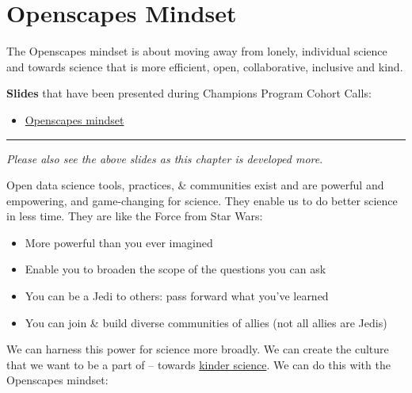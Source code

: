 \documentclass[
  letterpaper,
  DIV=11,
  numbers=noendperiod]{scrreprt}
\providecommand{\tightlist}{%
  \setlength{\itemsep}{0pt}\setlength{\parskip}{0pt}}
\begin{document}
\hypertarget{mindset}{%
\chapter{Openscapes Mindset}\label{mindset}}

The Openscapes mindset is about moving away from lonely, individual
science and towards science that is more efficient, open, collaborative,
inclusive and kind.

\textbf{Slides} that have been presented during Champions Program Cohort
Calls:

\begin{itemize}
\tightlist
\item
  \href{https://docs.google.com/presentation/d/1giEW0EIYVnxneGpOBSJnEqg-1CVBUGrbH8Z5gawdeBc/edit?usp=sharing}{Openscapes
  mindset}
\end{itemize}

\begin{center}\rule{0.5\linewidth}{0.5pt}\end{center}

\emph{Please also see the above slides as this chapter is developed
more}.

Open data science tools, practices, \& communities exist and are
powerful and empowering, and game-changing for science. They enable us
to do better science in less time. They are like the Force from Star
Wars:

\begin{itemize}
\tightlist
\item
  More powerful than you ever imagined
\item
  Enable you to broaden the scope of the questions you can ask
\item
  You can be a Jedi to others: pass forward what you've learned
\item
  You can join \& build diverse communities of allies (not all allies
  are Jedis)
\end{itemize}

We can harness this power for science more broadly. We can create the
culture that we want to be a part of -- towards
\href{https://blogs.scientificamerican.com/observations/open-software-means-kinder-science/}{kinder
science}. We can do this with the Openscapes mindset:
\end{document}
